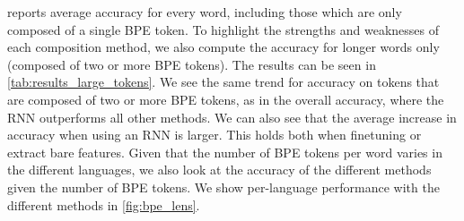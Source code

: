 \documentclass[11pt]{article}
\begin{document}
             reports average accuracy for
     every word, including those which are only composed of a single
     BPE token. To highlight the strengths and weaknesses of each
     composition method, we also compute the accuracy for longer words
     only (composed of two or more BPE tokens). The results can be
     seen in \cref{tab:results_large_tokens}.  We see the same trend
     for accuracy on tokens that are composed of two or more BPE
     tokens, as in the overall accuracy, where the RNN outperforms all
     other methods. We can also see that the average increase in
     accuracy when using an RNN is larger. This holds both when
     finetuning or extract bare features.
        Given that the number of BPE tokens per word varies in the
     different languages, we also look at the accuracy of the
     different methods given the number of BPE tokens. We show
     per-language performance with the different methods in
     \cref{fig:bpe_lens}.
    
\end{document}
